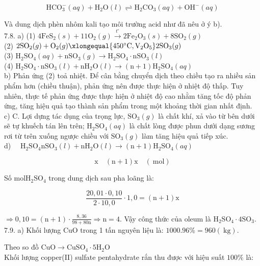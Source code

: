 \documentclass[10pt]{article}
\begin{document}
$$
\mathrm{HCO}_{3}^{-}(a q)+\mathrm{H}_{2} \mathrm{O}(l) \rightleftharpoons \mathrm{H}_{2} \mathrm{CO}_{3}(a q)+\mathrm{OH}^{-}(a q)
$$

Và dung dịch phèn nhôm kali tạo môi trường acid như đã nêu ở ý b).\\
7.8. a) (1) $4 \mathrm{FeS}_{2}(s)+11 \mathrm{O}_{2}(g) \xrightarrow{t^{\circ}} 2 \mathrm{Fe}_{2} \mathrm{O}_{3}(s)+8 \mathrm{SO}_{2}(g)$\\
(2) $2 \mathrm{SO}_{2}(g)+\mathrm{O}_{2}(g) \xlongequal{450^{\circ} \mathrm{C}, \mathrm{V}_{2} \mathrm{O}_{5}} 2 \mathrm{SO}_{3}(g)$\\
(3) $\mathrm{H}_{2} \mathrm{SO}_{4}(a q)+\mathrm{nSO}_{3}(g) \rightarrow \mathrm{H}_{2} \mathrm{SO}_{4} \cdot \mathrm{nSO}_{3}(l)$\\
(4) $\mathrm{H}_{2} \mathrm{SO}_{4} \cdot \mathrm{nSO}_{3}(l)+\mathrm{nH}_{2} \mathrm{O}(l) \rightarrow(\mathrm{n}+1) \mathrm{H}_{2} \mathrm{SO}_{4}(a q)$\\
b) Phản ứng (2) toả nhiệt. Để cân bằng chuyển dịch theo chiều tạo ra nhiều sản phẩm hơn (chiều thuận), phản ứng nên được thực hiện ở nhiệt độ thấp. Tuy nhiên, thực tế phản ứng được thực hiện ở nhiệt độ cao nhằm tăng tốc độ phản ứng, tăng hiệu quả tạo thành sản phẩm trong một khoảng thời gian nhất định.\\
c) C. Lợi dựng tác dụng của trọng lực, $\mathrm{SO}_{3}(g)$ là chất khí, xả vào từ bên dưới sẽ tự khuếch tán lên trên; $\mathrm{H}_{2} \mathrm{SO}_{4}(a q)$ là chất lòng được phun dưới dạng sương rơi từ trên xuống ngược chiều với $\mathrm{SO}_{3}(g)$ làm tăng hiệu quả tiếp xúc.\\
d) $\quad \mathrm{H}_{2} \mathrm{SO}_{4} \mathrm{nSO}_{3}(l)+\mathrm{nH}_{2} \mathrm{O}(l) \rightarrow(\mathrm{n}+1) \mathrm{H}_{2} \mathrm{SO}_{4}(a q)$

$$
\mathrm{x} \quad(\mathrm{n}+1) \mathrm{x} \quad(\mathrm{~mol})
$$

Số $\mathrm{mol} \mathrm{H}_{2} \mathrm{SO}_{4}$ trong dung dịch sau pha loãng là:

$$
\frac{20,01 \cdot 0,10}{2 \cdot 10,0} \cdot 1,0=(\mathrm{n}+1) \mathrm{x}
$$

$\Rightarrow 0,10=(\mathrm{n}+1) \cdot \frac{8,36}{98+80 \mathrm{n}} \Rightarrow \mathrm{n}=4$. Vậy công thức của oleum là $\mathrm{H}_{2} \mathrm{SO}_{4} \cdot 4 \mathrm{SO}_{3}$.\\
7.9. a) Khối lượng CuO trong 1 tấn nguyên liệu là: $1000.96 \%=960(\mathrm{~kg})$.

Theo so đồ $\mathrm{CuO} \rightarrow \mathrm{CuSO}_{4} \cdot 5 \mathrm{H}_{2} \mathrm{O}$\\
Khối lượng copper(II) sulfate pentahydrate rắn thu được với hiệu suất $100 \%$ là:
\end{document}
